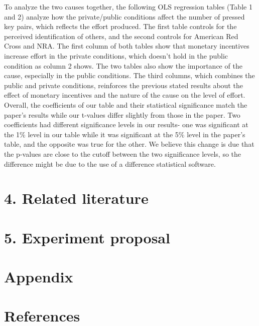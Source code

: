\documentclass[]{elsarticle} %
\begin{document}
To analyze the two causes together, the following OLS regression tables
(Table 1 and 2) analyze how the private/public conditions affect the
number of pressed key pairs, which reflects the effort produced. The
first table controls for the perceived identification of others, and the
second controls for American Red Cross and NRA. The first column of both
tables show that monetary incentives increase effort in the private
conditions, which doesn't hold in the public condition as column 2
shows. The two tables also show the importance of the cause, especially
in the public conditions. The third columns, which combines the public
and private conditions, reinforces the previous stated results about the
effect of monetary incentives and the nature of the cause on the level
of effort. Overall, the coefficients of our table and their statistical
significance match the paper's results while our t-values differ
slightly from those in the paper. Two coefficients had different
significance levels in our results- one was significant at the 1\% level
in our table while it was significant at the 5\% level in the paper's
table, and the opposite was true for the other. We believe this change
is due that the p-values are close to the cutoff between the two
significance levels, so the difference might be due to the use of a
difference statistical software.

\section{4. Related literature}\label{related-literature}

\section{5. Experiment proposal}\label{experiment-proposal}

\section{Appendix}\label{appendix}

\section{References}\label{references}
\end{document}
